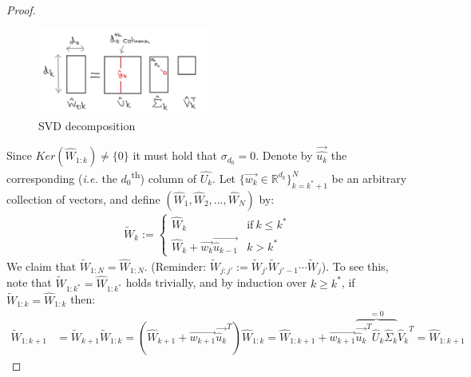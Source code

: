 \documentclass[12pt]{article}
\newcommand{\ie}{{\it i.e. }}
\begin{document}
\begin{proof}
	    \newline
	    \begin{figure}[ht!]
    		\vspace{1mm}
    		\centering
    		\includegraphics[width=0.5\textwidth]{figs/svd}
    		\caption{
    			SVD decomposition
    		}
    		\label{fig:svd}
	    \end{figure}
	    \newline
	    Since $Ker({{\widehat{W}_{1:k}}}) \neq \{0\}$ it must hold that $\sigma_{d_0} = 0$. Denote by $\overrightarrow{\widehat{u_k}}$ the corresponding (\ie the $d_0$\textsuperscript{th}) column of $\widehat{U_k}$. Let $\{\overrightarrow{w_k} \in {\mathbb{R}^{d_k}}\}_{k = k^\ast + 1} ^ N$ be an arbitrary collection of vectors, and define $({\widehat{W}_1}, {\widehat{W}_2}, ... , {\widehat{W}_N})$ by:
	    \begin{align*}
	        {\widetilde{W}_k}:=
	            \begin{cases}
	                    {\widehat{W}_k} & \text{if}\ k \leq k^\ast \\
	                    {\widehat{W}_k} + \overrightarrow{w_k}\overrightarrow{{\widehat{u}_{k-1}}} & k > k^\ast
	            \end{cases}
	    \end{align*}
	    We claim that ${{\widetilde{W}_{1:N}}} = {{\widehat{W}_{1:N}}}$. (Reminder: ${\widetilde{W}_{j:j'}} := {\widetilde{W}_{j'}} {\widetilde{W}_{j'-1}} \cdots {\widetilde{W}_j}$). \newline
	    To see this, note that ${\widetilde{W}_{1:k^\ast}} = {\widehat{W}_{1:k^\ast}}$ holds trivially, and by induction over $k \geq k^\ast$, if ${\widetilde{W}_{1:k}} = {\widehat{W}_{1:k}}$ then:
	    \begin{align*}
	        {\widetilde{W}_{1:k+1}} & = {\widetilde{W}_{k+1}} {\widetilde{W}_{1:k}} = ({\widehat{W}_{k+1}} + \overrightarrow{w_{k+1}} \overrightarrow{{\widehat{u}_k}}^T) {{\widehat{W}_{1:k}}} = {\widehat{W}_{1:k+1}} + \overrightarrow{w_{k+1}} 
	        \overbrace{\overrightarrow{{\widehat{u}_k}}^T {\widehat{U}_k} {\widehat{\Sigma}_k}}^{=0} {\widehat{V}_k}^T = {\widehat{W}_{1:k+1}}
	    \end{align*}

\end{proof}
\end{document}
